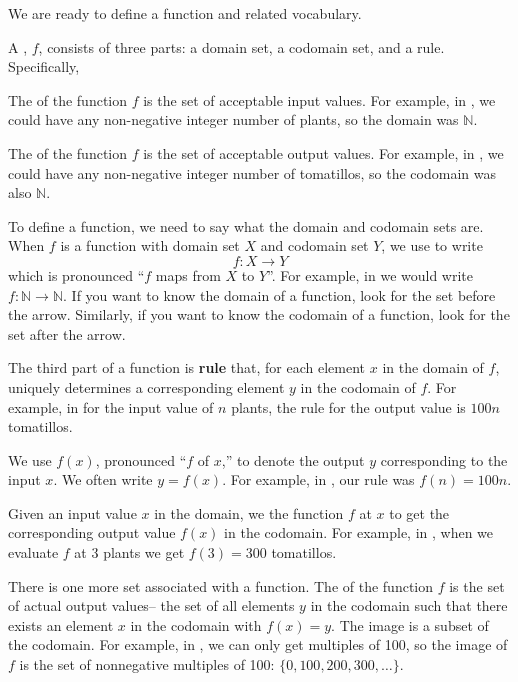 We are ready to define a function and related vocabulary.

\begin{defn}[Function]
\label{defn_function}  
    A , $f$, consists of three parts: a domain set, a codomain set, and a rule. Specifically,
        \begin{apart} 
            \item The  of the function $f$ is the set of acceptable input values.  For example, in , we could have any non-negative integer number of plants, so the domain was $\mathbb{N}$.
            
             \item The  of the function $f$ is the set of acceptable output values.  For example, in , we could have any non-negative integer number of tomatillos, so the codomain was also $\mathbb{N}$.
            
            \item To define a function, we need to say what the domain and codomain sets are. When $f$ is a function with domain set $X$ and codomain set $Y$, we use  to write 
            $$f:X \to Y$$
            which is pronounced ``$f$ maps from $X$ to $Y$''.  For example, in  we would write $f: \mathbb{N} \to \mathbb{N}$.  If you want to know the domain of a function, look for the set before the arrow.  Similarly, if you want to know the codomain of a function, look for the set after the arrow. 
            
            \item \label{part_function_rule} The third part of a function is \textbf{rule} that, for each element $x$ in the domain of $f$, uniquely determines a corresponding element $y$ in the codomain of $f$. For example, in  for the input value of $n$ plants, the rule for the output value is $100n$ tomatillos.  

            \item We use  $f(x)$, pronounced ``$f$ of $x$,'' to denote the  output $y$ corresponding to the input $x$. We often write $y=f(x)$. For example, in , our rule was $f(n)=100n$.  
                    
            \item Given an input value $x$ in the domain, we  the function $f$ at $x$ to get the  corresponding output value $f(x)$ in the codomain. For example, in , when we evaluate $f$ at 3 plants we get $f(3) = 300$ tomatillos.

            \item There is one more set associated with a function.  The  of the function $f$ is the set of actual output values-- the set of all elements $y$ in the codomain such that there exists an element $x$ in the codomain with $f(x) = y$.  The image is a subset of the codomain. For example, in , we can only get multiples of 100, so the image of $f$ is the set of nonnegative multiples of 100: $\{0, 100, 200, 300, \ldots\}$.  
        \end{apart}
\end{defn}
